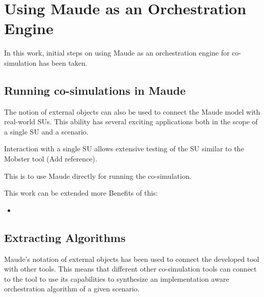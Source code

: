 \section{Using Maude as an Orchestration Engine}
In this work, initial steps on using Maude as an orchestration engine for co-simulation has been taken.


\subsection{Running co-simulations in Maude}
The notion of external objects can also be used to connect the Maude model with real-world SUs.
This ability has several exciting applications both in the scope of a single SU and a scenario.

Interaction with a single SU allows extensive testing of the SU similar to the Mobster tool (Add reference).  

This is to use Maude directly for running the co-simulation.


This work can be extended more 
Benefits of this:
\begin{itemize}
    \item 
\end{itemize}

\subsection{Extracting Algorithms}
Maude's notation of external objects  has been used to connect the developed tool with other tools. 
This means that different other co-simulation tools can connect to the tool to use its capabilities to synthesize an implementation aware orchestration algorithm of a given scenario.
